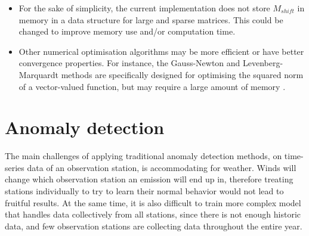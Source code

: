 \documentclass{article}
\begin{document}
\begin{itemize}
    \item For the sake of simplicity, the current implementation does not store $M_{shift}$ in memory in a data structure for large and sparse matrices. This could be changed to improve memory use and/or computation time.
    
    \item Other numerical optimisation algorithms may be more efficient or have better convergence properties. For instance, the Gauss-Newton and Levenberg-Marquardt methods are specifically designed for optimising the squared norm of a vector-valued function, but may require a large amount of memory \cite[Section 10.3]{Nocedal2006}.
    
\end{itemize}
    
\section{Anomaly detection}


The main challenges of applying traditional anomaly detection methods, on time-series data of an observation station, is accommodating for weather. Winds will change which observation station an emission will end up in, therefore treating stations individually to try to learn their normal behavior would not lead to fruitful results. At the same time, it is also difficult to train more complex model that handles data collectively from all stations, since there is not enough historic data, and few observation stations are collecting data throughout the entire year.\\
\end{document}
